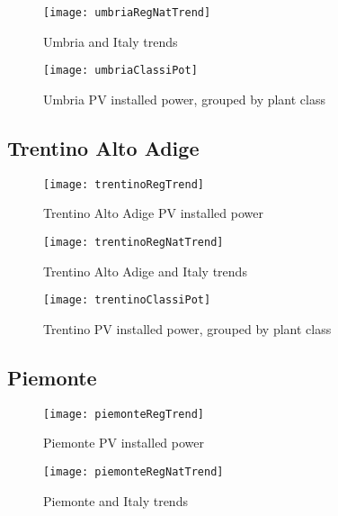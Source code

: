 \documentclass[12pt,a4paper,openright,twoside]{report}
\begin{document}
\begin{figure}[hp]
	\centering
	\texttt{[image: umbriaRegNatTrend]}
	\caption{Umbria and Italy trends}
	\label{umbriaRegNatTrend}
\end{figure}

\begin{figure}[hp]
	\centering
	\texttt{[image: umbriaClassiPot]}
	\caption{Umbria PV installed power, grouped by plant class}
	\label{umbriaClassiPot}
\end{figure}

\clearpage

\subsection*{Trentino Alto Adige}

\begin{figure}[hp]
	\centering
	\texttt{[image: trentinoRegTrend]}
	\caption{Trentino Alto Adige PV installed power}
	\label{trentinoRegTrend}
\end{figure}

\begin{figure}[hp]
	\centering
	\texttt{[image: trentinoRegNatTrend]}
	\caption{Trentino Alto Adige and Italy trends}
	\label{trentinoRegNatTrend}
\end{figure}

\clearpage

\begin{figure}[hp]
	\centering
	\texttt{[image: trentinoClassiPot]}
	\caption{Trentino PV installed power, grouped by plant class}
	\label{trentinoClassiPot}
\end{figure}



\subsection*{Piemonte}

\begin{figure}[hp]
	\centering
	\texttt{[image: piemonteRegTrend]}
	\caption{Piemonte PV installed power}
	\label{piemonteRegTrend}
\end{figure}

\begin{figure}[hp]
	\centering
	\texttt{[image: piemonteRegNatTrend]}
	\caption{Piemonte and Italy trends}
	\label{piemonteRegNatTrend}
\end{figure}
\end{document}
